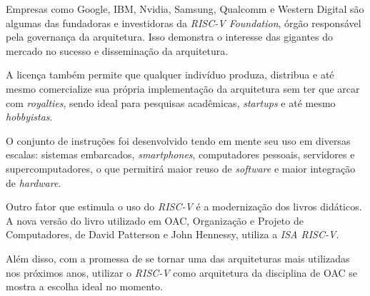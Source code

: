 {
    Empresas como Google, IBM, Nvidia, Samsung, Qualcomm e Western Digital são
    algumas das fundadoras e investidoras da \textit{RISC-V Foundation}, órgão
    responsável pela governança da arquitetura. Isso demonstra o interesse das
    gigantes do mercado no sucesso e disseminação da arquitetura.
}

{
    A licença também permite que qualquer indivíduo produza, distribua e
    até mesmo comercialize sua própria implementação da arquitetura sem ter
    que arcar com \textit{royalties}, sendo ideal para pesquisas acadêmicas,
    \textit{startups} e até mesmo \textit{hobbyistas}.
}

{
    O conjunto de instruções foi desenvolvido tendo em mente seu uso em
    diversas escalas: sistemas embarcados, \textit{smartphones},
    computadores pessoais, servidores e supercomputadores, o que permitirá
    maior reuso de \textit{software} e maior integração de
    \textit{hardware}.
}

{
    Outro fator que estimula o uso do \textit{RISC-V} é a modernização dos
    livros didáticos. A nova versão do livro utilizado em OAC, Organização
    e Projeto de Computadores, de David Patterson e John Hennessy, utiliza
    a \textit{ISA RISC-V}.
}

{
    Além disso, com a promessa de se tornar uma das arquiteturas mais utilizadas
    nos próximos anos, utilizar o \textit{RISC-V} como arquitetura da disciplina
    de OAC se mostra a escolha ideal no momento.
}

